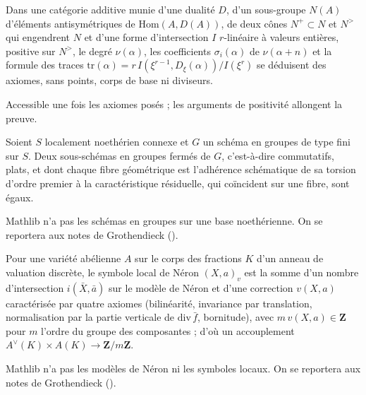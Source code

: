 \begin{encadre}
\begin{conjecture*}
Dans une catégorie additive munie d'une dualité $D$, d'un sous-groupe $N(A)$ d'éléments antisymétriques de $\mathrm{Hom}(A, D(A))$, de deux cônes $N^+ \subset N$ et $N^>$ qui engendrent $N$ et d'une forme d'intersection $I$ $r$-linéaire à valeurs entières, positive sur $N^>$, le degré $\nu(\alpha)$, les coefficients $\sigma_i(\alpha)$ de $\nu(\alpha + n)$ et la formule des traces $\mathrm{tr}(\alpha) = r\,I(\xi^{r-1}, D_\xi(\alpha))/I(\xi^r)$ se déduisent des axiomes, sans points, corps de base ni diviseurs.
\end{conjecture*}
\end{encadre}
{\small Accessible une fois les axiomes posés ; les arguments de positivité allongent la preuve.\par}

\begin{encadre}
\begin{conjecture*}
Soient $S$ localement noethérien connexe et $G$ un schéma en groupes de type fini sur $S$. Deux sous-schémas en groupes fermés  de $G$, c'est-à-dire commutatifs, plats, et dont chaque fibre géométrique est l'adhérence schématique de sa torsion d'ordre premier à la caractéristique résiduelle, qui coïncident sur une fibre, sont égaux.
\end{conjecture*}
\end{encadre}
{\small Mathlib n'a pas les schémas en groupes sur une base noethérienne. On se reportera aux notes de Grothendieck ().\par}

\begin{encadre}
\begin{conjecture*}
Pour une variété abélienne $A$ sur le corps des fractions $K$ d'un anneau de valuation discrète, le symbole local de Néron $(X, a)_v$ est la somme d'un nombre d'intersection $i(\bar X, \bar a)$ sur le modèle de Néron et d'une correction $v(X, a)$ caractérisée par quatre axiomes (bilinéarité, invariance par translation, normalisation par la partie verticale de $\mathrm{div}\,\bar f$, bornitude), avec $m\,v(X, a) \in \mathbf Z$ pour $m$ l'ordre du groupe des composantes ; d'où un accouplement $A^\vee(K) \times A(K) \to \mathbf Z/m\mathbf Z$.
\end{conjecture*}
\end{encadre}
{\small Mathlib n'a pas les modèles de Néron ni les symboles locaux. On se reportera aux notes de Grothendieck ().\par}
